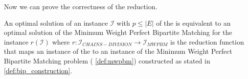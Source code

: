 Now we can prove the correctness of the reduction.

\begin{theorem}
    An optimal solution of an instance $\mathcal I$ with $p \leq |E|$ of the  is equivalent to an optimal solution of the Minimum Weight Perfect Bipartite Matching for the instance $r(\mathcal I)$ where $r: \mathcal{I}_{CHAINS-DIVISION} \rightarrow \mathcal{I}_{MWPBM}$ is the reduction function that maps an instance of the  to an instance of the Minimum Weight Perfect Bipartite Matching problem ( \ref{def:mwpbm})  constructed as stated in \ref{def:bip_construction}.
\end{theorem}

